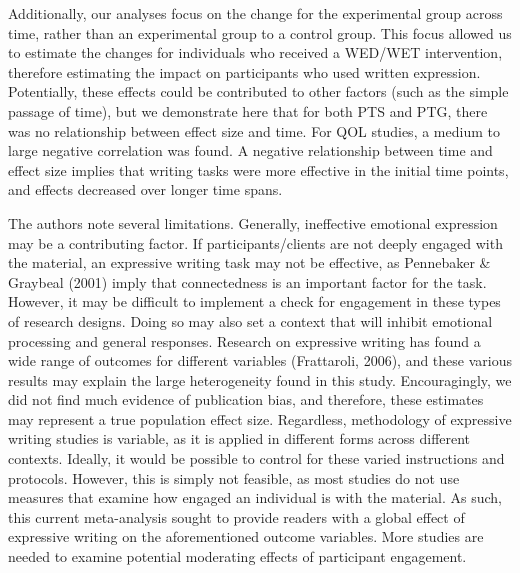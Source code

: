 \documentclass[man]{apa6}
\newcounter{author}
\theoremstyle{definition}
\theoremstyle{definition}
\theoremstyle{definition}
\theoremstyle{remark}
\begin{document}
Additionally, our analyses focus on the change for the experimental
group across time, rather than an experimental group to a control group.
This focus allowed us to estimate the changes for individuals who
received a WED/WET intervention, therefore estimating the impact on
participants who used written expression. Potentially, these effects
could be contributed to other factors (such as the simple passage of
time), but we demonstrate here that for both PTS and PTG, there was no
relationship between effect size and time. For QOL studies, a medium to
large negative correlation was found. A negative relationship between
time and effect size implies that writing tasks were more effective in
the initial time points, and effects decreased over longer time spans.

The authors note several limitations. Generally, ineffective emotional
expression may be a contributing factor. If participants/clients are not
deeply engaged with the material, an expressive writing task may not be
effective, as Pennebaker \& Graybeal (2001) imply that connectedness is
an important factor for the task. However, it may be difficult to
implement a check for engagement in these types of research designs.
Doing so may also set a context that will inhibit emotional processing
and general responses. Research on expressive writing has found a wide
range of outcomes for different variables (Frattaroli, 2006), and these
various results may explain the large heterogeneity found in this study.
Encouragingly, we did not find much evidence of publication bias, and
therefore, these estimates may represent a true population effect size.
Regardless, methodology of expressive writing studies is variable, as it
is applied in different forms across different contexts. Ideally, it
would be possible to control for these varied instructions and
protocols. However, this is simply not feasible, as most studies do not
use measures that examine how engaged an individual is with the
material. As such, this current meta-analysis sought to provide readers
with a global effect of expressive writing on the aforementioned outcome
variables. More studies are needed to examine potential moderating
effects of participant engagement.
\end{document}
